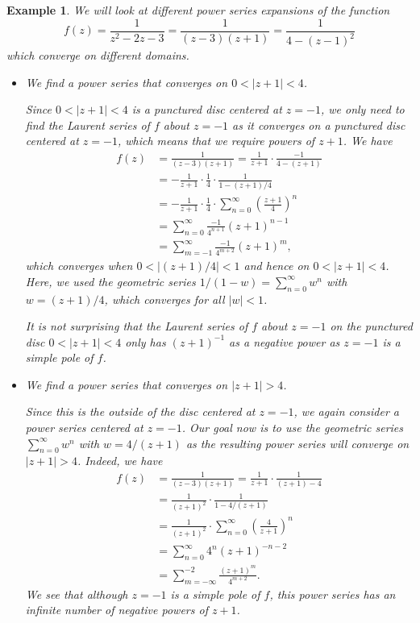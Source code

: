 \documentclass[10pt]{article}
\theoremstyle{newstyle}
\newtheorem{exmp}[thm]{Example}
\begin{document}
\begin{exmp}
We will look at different power series expansions of the function 
\[ f(z) = \frac{1}{z^2-2z-3} = \frac{1}{(z-3)(z+1)} = \frac{1}{4-(z-1)^2} \] 
which converge on different domains. 
\begin{itemize}
    \item We find a power series that converges on $0 < |z+1| < 4$. 
    
    Since $0 < |z+1| < 4$ is a punctured disc centered at $z = -1$, we only need to find the Laurent 
    series of $f$ about $z = -1$ as it converges on a punctured disc centered at $z = -1$, 
    which means that we require powers of $z+1$. We have 
    \begin{align*}
        f(z) &= \frac{1}{(z-3)(z+1)} = \frac{1}{z+1} \cdot \frac{-1}{4-(z+1)} \\
        &= -\frac{1}{z+1} \cdot \frac14 \cdot \frac{1}{1-(z+1)/4} \\
        &= -\frac{1}{z+1} \cdot \frac14 \cdot \sum_{n=0}^\infty \left( \frac{z+1}4 \right)^n \\
        &= \sum_{n=0}^\infty \frac{-1}{4^{n+1}}(z+1)^{n-1} \\
        &= \sum_{m=-1}^\infty \frac{-1}{4^{m+2}}(z+1)^m, 
    \end{align*}
    which converges when $0 < |(z+1)/4| < 1$ and hence on $0 < |z+1| < 4$. Here, we used the 
    geometric series $1/(1-w) = \sum_{n=0}^\infty w^n$ with $w = (z+1)/4$, which converges 
    for all $|w| < 1$. 
    
    It is not surprising that the Laurent series of $f$ about $z = -1$ on the punctured 
    disc $0 < |z+1| < 4$ only has $(z+1)^{-1}$ as a negative power as $z = -1$ is a simple pole of $f$. 
    
    \newpage 
    \item We find a power series that converges on $|z+1|>4$. 
    
    Since this is the outside of the disc centered at $z = -1$, we again consider a power series 
    centered at $z = -1$. Our goal now is to use the geometric series $\sum_{n=0}^\infty w^n$ 
    with $w = 4/(z+1)$ as the resulting power series will converge on $|z+1| > 4$. Indeed, we have 
    \begin{align*}
        f(z) &= \frac{1}{(z-3)(z+1)} = \frac{1}{z+1} \cdot \frac{1}{(z+1) - 4} \\
        &= \frac{1}{(z+1)^2} \cdot \frac{1}{1 - 4/(z+1)} \\
        &= \frac{1}{(z+1)^2} \cdot \sum_{n=0}^\infty \left( \frac4{z+1} \right)^n \\
        &= \sum_{n=0}^\infty 4^n (z+1)^{-n-2} \\
        &= \sum_{m=-\infty}^{-2} \frac{(z+1)^m}{4^{m+2}}. 
    \end{align*}
    We see that although $z = -1$ is a simple pole of $f$, this power series has an infinite 
    number of negative powers of $z+1$. 
    

\end{itemize}
\end{exmp}
\end{document}
